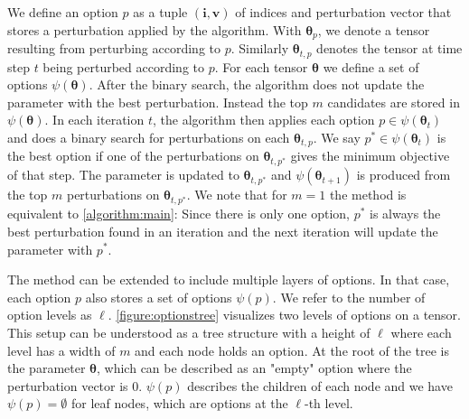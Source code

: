 We define an option $p$ as a tuple $(\mathbf{i}, \mathbf{v})$ of indices 
and perturbation vector that stores a perturbation 
applied by the algorithm. With $\bm{\theta}_p$, we denote a 
tensor resulting from perturbing according to $p$.
Similarly $\bm{\theta}_{t,p}$ denotes the tensor at time
step $t$ being perturbed according to $p$. 
For each tensor $\bm{\theta}$ 
we define a set of options $\psi(\bm{\theta})$. 
After the binary search, the algorithm does not update 
the parameter with the best perturbation. Instead the 
top $m$ candidates are stored in $\psi(\bm{\theta})$. 
In each iteration $t$, the algorithm then applies each 
option $p \in \psi(\bm{\theta}_t)$ and does a binary search for 
perturbations on each $\bm{\theta}_{t, p}$. We say
$p^* \in \psi(\bm{\theta}_t)$ is the best option if one of the 
perturbations on $\bm{\theta}_{t,p^*}$ gives the 
minimum objective of that step. The parameter is updated
to $\bm{\theta}_{t,p^*}$ and $\psi(\bm{\theta}_{t+1})$ is produced 
from the top $m$ perturbations on $\bm{\theta}_{t,p^*}$.
We note that for $m=1$ the method is equivalent to 
\autoref{algorithm:main}: Since there is only one option,
$p^*$ is always the best perturbation found in an iteration 
and the next iteration will update the parameter with $p^*$.

The method can be extended to include multiple 
layers of options. In that case, each option $p$ also 
stores a set of options $\psi(p)$. We refer to the number of 
option levels as $\ell$. 
\autoref{figure:optionstree} visualizes two levels of 
options on a tensor. 
This setup can be 
understood as a tree structure with a height of $\ell$ where 
each level has a width of $m$ and each node holds an 
option. At the root of the tree is 
the parameter $\bm{\theta}$, which can be described as an 
"empty" option where the perturbation vector is 0.
$\psi(p)$ describes the children of each node and
we have $\psi(p) = \emptyset$ for leaf nodes, which are 
options at the $\ell$-th level.

